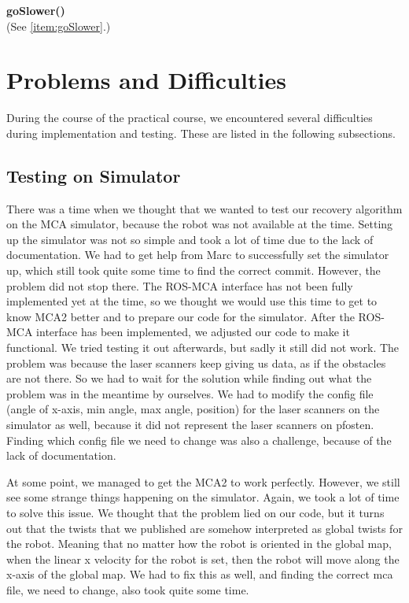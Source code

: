\begin{description}
\item \textbf{goSlower()} \hfill \\
(See \ref{item:goSlower}.) 
\end{description}

\section{Problems and Difficulties} \label{problems}
During the course of the practical course, we encountered several difficulties during implementation and testing. These are listed in the following subsections.

\subsection{Testing on Simulator}

There was a time when we thought that we wanted to test our recovery algorithm on the MCA simulator, because the robot was not available at the time. Setting up the simulator was not so simple and took a lot of time due to the lack of documentation. We had to get help from Marc to successfully set the simulator up, which still took quite some time to find the correct commit. However, the problem did not stop there. The ROS-MCA interface has not been fully implemented yet at the time, so we thought we would use this time to get to know MCA2 better and to prepare our code for the simulator. After the ROS-MCA interface has been implemented, we adjusted our code to make it functional. We tried testing it out afterwards, but sadly it still did not work. The problem was because the laser scanners keep giving us data, as if the obstacles are not there. So we had to wait for the solution while finding out what the problem was in the meantime by ourselves. We had to modify the config file (angle of x-axis, min angle, max angle, position) for the laser scanners on the simulator as well, because it did not represent the laser scanners on pfosten. Finding which config file we need to change was also a challenge, because of the lack of documentation. 

At some point, we managed to get the MCA2 to work perfectly. However, we still see some strange things happening on the simulator. Again, we took a lot of time to solve this issue. We thought that the problem lied on our code, but it turns out that the twists that we published are somehow interpreted as global twists for the robot. Meaning that no matter how the robot is oriented in the global map, when the linear x velocity for the robot is set, then the robot will move along the x-axis of the global map. We had to fix this as well, and finding the correct mca file, we need to change, also took quite some time.

